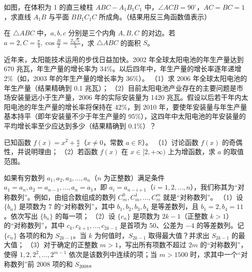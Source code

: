 \Needspace{0.4\textheight}
\begin{question}
如图，在体积为 1 的直三棱柱 $ABC-A_1B_1C_1$ 中，$\angle ACB=90^\circ$，$AC=BC=1$，求直线 $A_1B$ 与平面 $BB_1C_1C$ 所成角。（结果用反三角函数值表示）
\nopagebreak[4]
\begin{center}\end{center}
\nopagebreak[4]
\end{question}
\begin{question}
在 $\triangle ABC$ 中，$a,b,c$ 分别是三个内角 $A,B,C$ 的对边。若 $a=2,C=\frac\pi4,\cos\frac B2=\frac{2\sqrt5}{5}$，求 $\triangle ABC$ 的面积 $S$。
\end{question}
\begin{question}
近年来，太阳能技术运用的步伐日益加快。2002 年全球太阳电池的年生产量达到 670 兆瓦，年生产量的增长率为 34\%。以后四年中，年生产量的增长率逐年递增 2\%（如，2003 年的年生产量的增长率为 36\%）。
（1）求 2006 年全球太阳电池的年生产量（结果精确到 0.1 兆瓦）；
（2）目前太阳电池产业存在的主要问题是市场安装量远小于生产量，2006 年的实际安装量为 1420 兆瓦。假设以后若干年内太阳电池的年生产量的增长率将保持在 42\%，到 2010 年，要使年安装量与年生产量基本持平（即年安装量不少于年生产量的 95\%），这四年中太阳电池的年安装量的平均增长率至少应达到多少（结果精确到 0.1\%）？
\end{question}
\begin{question}
已知函数 $f(x)=x^2+\frac ax$（$x\ne0$，常数 $a\in\mathbb R$）。
（1）讨论函数 $f(x)$ 的奇偶性，并说明理由；
（2）若函数 $f(x)$ 在 $x\in[2,+\infty)$ 上为增函数，求 $a$ 的取值范围。
\end{question}
\begin{question}
如果有穷数列 $a_1,a_2,a_3,\ldots,a_n$（$n$ 为正整数）满足条件 $a_1=a_n,a_2=a_{n-1},\ldots,a_n=a_1$，即 $a_i=a_{n-i+1}$（$i=1,2,\ldots,n$），我们称其为“对称数列”。例如，由组合数组成的数列 $C_m^0,C_m^1,\ldots,C_m^m$ 就是“对称数列”。
（1）设 $\{b_n\}$ 是项数为 7 的“对称数列”，其中 $b_1,b_2,b_3,b_4$ 是等差数列，且 $b_1=2,b_4=11$。依次写出 $\{b_n\}$ 的每一项；
（2）设 $\{c_n\}$ 是项数为 $2k-1$（正整数 $k>1$）的“对称数列”，其中 $c_k,c_{k+1},\ldots,c_{2k-1}$ 是首项为 50、公差为 $-4$ 的等差数列。记 $\{c_n\}$ 各项的和为 $S_{2k-1}$。当 $k$ 为何值时，$S_{2k-1}$ 取得最大值？并求出 $S_{2k-1}$ 的最大值；
（3）对于确定的正整数 $m>1$，写出所有项数不超过 $2m$ 的“对称数列”，使得 $1,2,2^2,\ldots,2^{m-1}$ 依次是该数列中连续的项；当 $m>1500$ 时，求其中一个“对称数列”前 2008 项的和 $S_{2008}$。
\Needspace{0.4\textheight}
\end{question}
